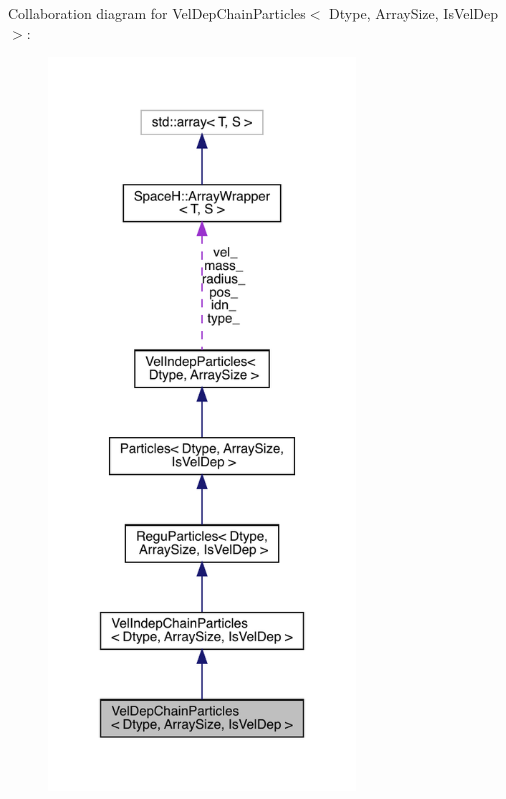 Collaboration diagram for Vel\+Dep\+Chain\+Particles$<$ Dtype, Array\+Size, Is\+Vel\+Dep $>$\+:
\nopagebreak
\begin{figure}[H]
\begin{center}
\leavevmode
\includegraphics[height=550pt]{class_vel_dep_chain_particles__coll__graph}
\end{center}
\end{figure}
